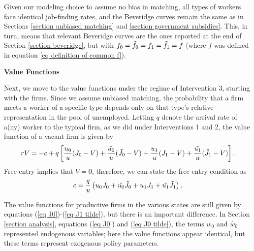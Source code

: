 \documentclass[12pt]{article} %
\theoremstyle{definition}
\begin{document}
\noindent Given our modeling choice to assume no bias in matching, all types of workers face identical job-finding rates, and the Beveridge curves remain the same as in Sections \ref{section unbiased matching} and \ref{section government subsidies}. This, in turn, means that relevant Beveridge curves are the ones reported at the end of Section \ref{section beveridge}, but with $f_0=\Tilde{f_0}=f_1=\Tilde{f_1}=f$ (where $f$ was defined in equation \ref{eq definition of common f}). 

\bigskip 

\noindent \textbf{Value Functions}

\noindent Next, we move to the value functions under the regime of Intervention 3, starting with the firms. Since we assume unbiased matching, the probability that a firm meets a worker of a specific type depends only on that type's relative representation in the pool of unemployed. Letting $q$ denote the arrival rate of a(ny) worker to the typical firm, as we did under Interventions 1 and 2, the value function of a vacant firm is given by 
\begin{equation}
   rV = -c + q \left[\frac{u_0}{u}(J_0-V) + \frac{\Tilde{u_0}}{u}(\Tilde{J_0}-V) + \frac{u_1}{u}(J_1-V) +  \frac{\Tilde{u_1}}{u}(\Tilde{J_1}-V) \right].\nonumber 
\end{equation}Free entry implies that $V=0$, therefore, we can state the free entry condition as 
\begin{equation}
 c = \frac{q}{u} \left({u_0} J_0 + \Tilde{u_0} \Tilde{J_0} + {u_1} J_1 +  \Tilde{u_1} \Tilde{J_1} \right).\label{eq free entry inter 3} 
\end{equation}

The value functions for productive firms in the various states are still given by equations (\ref{eq J0})-(\ref{eq J1 tilde}), 
but there is an important difference. In Section \ref{section analysis}, equations (\ref{eq J0}) and (\ref{eq J0 tilde}), the terms $w_0$ and $\tilde{w_0}$ represented endogenous variables; here the value functions appear identical, but these terms represent exogenous policy parameters.   
\end{document}
